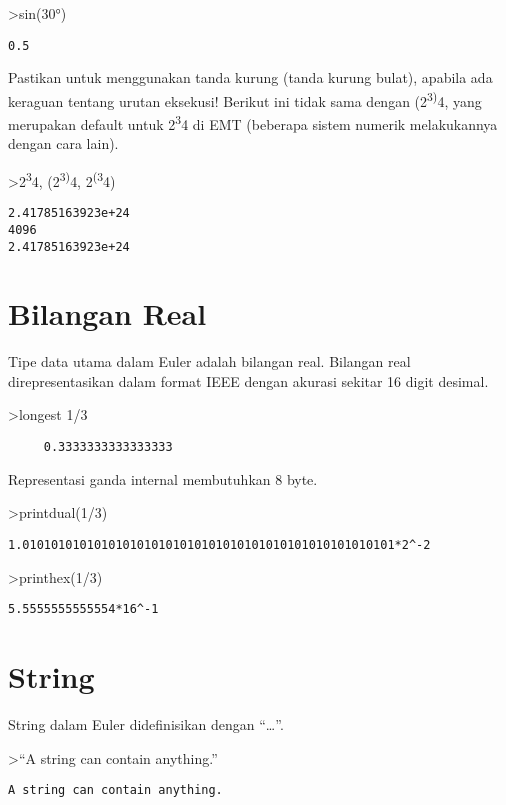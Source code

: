 \documentclass[
]{book}
\begin{document}
\textgreater sin(30°)

\begin{verbatim}
0.5
\end{verbatim}

Pastikan untuk menggunakan tanda kurung (tanda kurung bulat), apabila ada keraguan tentang urutan eksekusi! Berikut ini tidak sama dengan (2\textsuperscript{3)}4, yang merupakan default untuk 2\textsuperscript{3}4 di EMT (beberapa sistem numerik melakukannya dengan cara lain).

\textgreater2\textsuperscript{3}4, (2\textsuperscript{3)}4, 2\textsuperscript{(3}4)

\begin{verbatim}
2.41785163923e+24
4096
2.41785163923e+24
\end{verbatim}

\section{Bilangan Real}\label{bilangan-real}

Tipe data utama dalam Euler adalah bilangan real. Bilangan real direpresentasikan dalam format IEEE dengan akurasi sekitar 16 digit desimal.

\textgreater longest 1/3

\begin{verbatim}
     0.3333333333333333 
\end{verbatim}

Representasi ganda internal membutuhkan 8 byte.

\textgreater printdual(1/3)

\begin{verbatim}
1.0101010101010101010101010101010101010101010101010101*2^-2
\end{verbatim}

\textgreater printhex(1/3)

\begin{verbatim}
5.5555555555554*16^-1
\end{verbatim}

\section{String}\label{string}

String dalam Euler didefinisikan dengan ``\ldots{}''.

\textgreater{}``A string can contain anything.''

\begin{verbatim}
A string can contain anything.
\end{verbatim}
\end{document}
